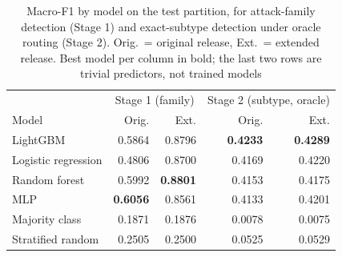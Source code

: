 \begin{table}[!t]
\caption{Macro-F1 by model on the test partition, for attack-family
detection (Stage 1) and exact-subtype detection under oracle routing
(Stage 2).
Orig.\ = original release, Ext.\ = extended release. Best model per column in
bold; the last two rows are trivial predictors, not trained models}
\label{tab:stage_by_model}
\centering
\begin{tabular}{lrrrr}
\toprule
 & \multicolumn{2}{c}{Stage 1 (family)} & \multicolumn{2}{c}{Stage 2 (subtype, oracle)} \\
Model & Orig. & Ext. & Orig. & Ext. \\
\midrule
LightGBM & 0.5864 & 0.8796 & \textbf{0.4233} & \textbf{0.4289} \\
Logistic regression & 0.4806 & 0.8700 & 0.4169 & 0.4220 \\
Random forest & 0.5992 & \textbf{0.8801} & 0.4153 & 0.4175 \\
MLP & \textbf{0.6056} & 0.8561 & 0.4133 & 0.4201 \\
\midrule
Majority class & 0.1871 & 0.1876 & 0.0078 & 0.0075 \\
Stratified random & 0.2505 & 0.2500 & 0.0525 & 0.0529 \\
\bottomrule
\end{tabular}
\end{table}
